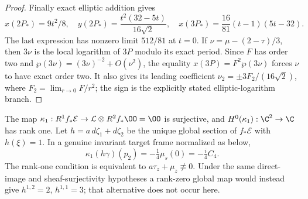 \begin{proof}
Finally exact elliptic addition gives
\[
x(2P_*)=9t^2/8,\quad
y(2P_*)=\frac{t^2(32-5t)}{16\sqrt2},\quad
x(3P_*)=\frac{16}{81}(t-1)(5t-32).
\]
The last expression has nonzero limit $512/81$ at $t=0$.
If $\nu=\mu-(2-\tau)/3$, then $3\nu$ is the local logarithm of
$3P$ modulo its exact period.  Since $F$ has order two and
$\wp(3\nu)=(3\nu)^{-2}+O(\nu^2)$, the equality
$x(3P)=F^2\wp(3\nu)$ forces $\nu$ to have exact order two.
It also gives its leading coefficient
$\nu_2=\pm3F_2/(16\sqrt2)$, where $F_2=\lim_{r\to0}F/r^2$;
the sign is the explicitly stated elliptic-logarithm branch.
\end{proof}

\begin{proposition}\label{inv:A2.4}\label{wb:thm:h12-scalar}
The map
$\kappa_1:R^1f_*\mathcal E\to\mathcal L\otimes R^2f_*\OO=\OO$
is surjective, and $H^0(\kappa_1):\C^2\to\C$ has rank one.
Let $h=a\,d\zeta_1+d\zeta_2$ be the unique global section of
$f_*\mathcal E$ with $h(\xi)=1$.  In a genuine invariant target
frame normalized as below,
\[
\kappa_1(h\gamma)(p_2)=-\tfrac14\mu_s(0)=-\tfrac i4 C_4.
\]
The rank-one condition is equivalent to
$a\tau_z+\mu_z\not\equiv0$.  Under the same direct-image and
sheaf-surjectivity hypotheses a rank-zero global map would instead
give $h^{1,2}=2$, $h^{1,1}=3$; that alternative does not occur here.
\end{proposition}

